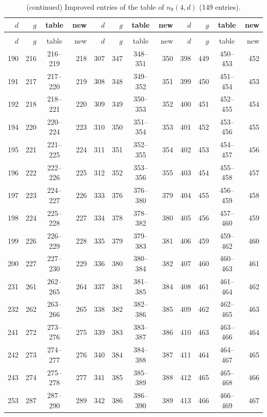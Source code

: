 \begin{longtable}{rrcr|rrcr|rrcr}
\caption{Improved entries of the table of $n_9(4,d)$ (149 entries).}\label{tab:q9}\\
\toprule
$d$ & $g$ & table & new & $d$ & $g$ & table & new & $d$ & $g$ & table & new \\
\midrule
\endfirsthead
\caption[]{(continued) Improved entries of the table of $n_9(4,d)$ (149 entries).}\\
\toprule
$d$ & $g$ & table & new & $d$ & $g$ & table & new & $d$ & $g$ & table & new \\
\midrule
\endhead
190 & 216 & 216--219 & 218 & 307 & 347 & 348--351 & 350 & 398 & 449 & 450--453 & 452 \\
191 & 217 & 217--220 & 219 & 308 & 348 & 349--352 & 351 & 399 & 450 & 451--454 & 453 \\
192 & 218 & 218--221 & 220 & 309 & 349 & 350--353 & 352 & 400 & 451 & 452--455 & 454 \\
194 & 220 & 220--224 & 223 & 310 & 350 & 351--354 & 353 & 401 & 452 & 453--456 & 455 \\
195 & 221 & 221--225 & 224 & 311 & 351 & 352--355 & 354 & 402 & 453 & 454--457 & 456 \\
196 & 222 & 222--226 & 225 & 312 & 352 & 353--356 & 355 & 403 & 454 & 455--458 & 457 \\
197 & 223 & 224--227 & 226 & 333 & 376 & 376--380 & 379 & 404 & 455 & 456--459 & 458 \\
198 & 224 & 225--228 & 227 & 334 & 378 & 378--382 & 380 & 405 & 456 & 457--460 & 459 \\
199 & 226 & 226--229 & 228 & 335 & 379 & 379--383 & 381 & 406 & 459 & 459--462 & 460 \\
200 & 227 & 227--230 & 229 & 336 & 380 & 380--384 & 382 & 407 & 460 & 460--463 & 461 \\
231 & 261 & 262--265 & 264 & 337 & 381 & 381--385 & 384 & 408 & 461 & 461--464 & 462 \\
232 & 262 & 263--266 & 265 & 338 & 382 & 382--386 & 385 & 409 & 462 & 462--465 & 463 \\
241 & 272 & 273--276 & 275 & 339 & 383 & 383--387 & 386 & 410 & 463 & 463--466 & 464 \\
242 & 273 & 274--277 & 276 & 340 & 384 & 384--388 & 387 & 411 & 464 & 464--467 & 465 \\
243 & 274 & 275--278 & 277 & 341 & 385 & 385--389 & 388 & 412 & 465 & 465--468 & 466 \\
253 & 287 & 287--290 & 289 & 342 & 386 & 386--390 & 389 & 413 & 466 & 466--469 & 467 \\

\end{longtable}
